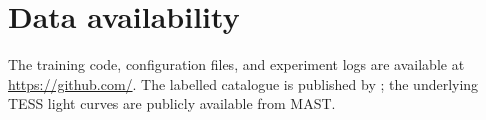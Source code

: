 \documentclass{aa}
\begin{document}


    \section*{Data availability}

    The training code, configuration files, and experiment logs are available at
    \url{https://github.com/}. The labelled catalogue is published by \citet{Skarka2022};
    the underlying TESS light curves are publicly available from MAST.

    
    
\end{document}
